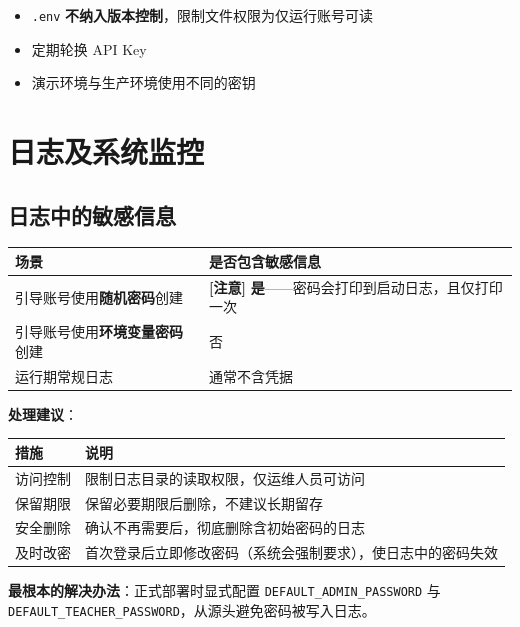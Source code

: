 \documentclass[UTF8,a4paper,11pt]{ctexrep}
\newcommand{\warnmark}{\textcolor{todobar}{\textbf{[注意]}}}
\begin{document}
\begin{itemize}
\item \texttt{.env} \textbf{不纳入版本控制}，限制文件权限为仅运行账号可读
\item 定期轮换 API Key
\item 演示环境与生产环境使用不同的密钥
\end{itemize}

\section{日志及系统监控}


\subsection{日志中的敏感信息}

\begin{center}
\small
\begin{tabularx}{\linewidth}{@{}XX@{}}
\toprule
场景 & 是否包含敏感信息 \\
\midrule
引导账号使用\textbf{随机密码}创建 & \warnmark{} \textbf{是}——密码会打印到启动日志，且仅打印一次 \\
引导账号使用\textbf{环境变量密码}创建 & 否 \\
运行期常规日志 & 通常不含凭据 \\
\bottomrule
\end{tabularx}
\end{center}
\textbf{处理建议}：

\begin{center}
\small
\begin{tabularx}{\linewidth}{@{}XX@{}}
\toprule
措施 & 说明 \\
\midrule
访问控制 & 限制日志目录的读取权限，仅运维人员可访问 \\
保留期限 & 保留必要期限后删除，不建议长期留存 \\
安全删除 & 确认不再需要后，彻底删除含初始密码的日志 \\
及时改密 & 首次登录后立即修改密码（系统会强制要求），使日志中的密码失效 \\
\bottomrule
\end{tabularx}
\end{center}
\begin{notebox}
\textbf{最根本的解决办法}：正式部署时显式配置 \texttt{DEFAULT\_ADMIN\_PASSWORD} 与 \texttt{DEFAULT\_TEACHER\_PASSWORD}，从源头避免密码被写入日志。

\end{notebox}
\end{document}
